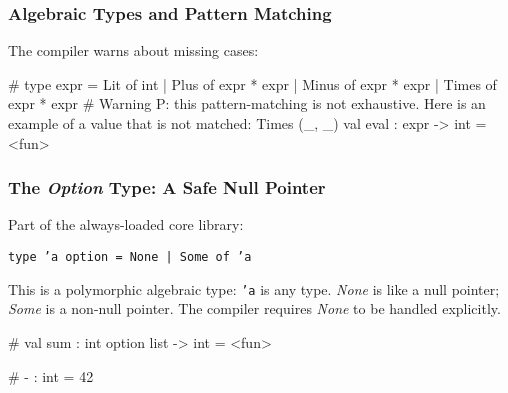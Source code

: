 \documentclass{plt}
\begin{document}
\begin{frame}[fragile]
  \frametitle{Algebraic Types and Pattern Matching}

The compiler warns about missing cases:

\begin{interactive}
# 
type expr =
    Lit of int
  | Plus of expr * expr
  | Minus of expr * expr
  | Times of expr * expr
# 
Warning P: this pattern-matching is not exhaustive.
Here is an example of a value that is not matched:
Times (_, _)
val eval : expr -> int = <fun>
\end{interactive}

\end{frame}

\begin{frame}[fragile]
  \frametitle{The \emph{Option} Type: A Safe Null Pointer}

Part of the always-loaded core library:

\begin{center}
\texttt{type 'a option = None | Some of 'a}
\end{center}

This is a polymorphic algebraic type: \texttt{'a} is any type.
\emph{None} is like a null pointer; \emph{Some} is a non-null pointer.
The compiler requires \emph{None} to be handled explicitly.

\begin{interactive}
# 
val sum : int option list -> int = <fun>

# 
- : int = 42
\end{interactive}

\end{frame}
\end{document}
